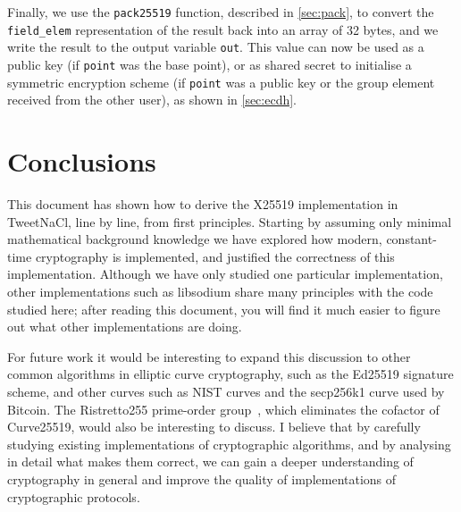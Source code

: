 \documentclass[manuscript]{acmart}
\begin{document}
Finally, we use the \verb|pack25519| function, described in \autoref{sec:pack}, to convert the \verb|field_elem| representation of the result back into an array of 32 bytes, and we write the result to the output variable \verb|out|.
This value can now be used as a public key (if \verb|point| was the base point), or as shared secret to initialise a symmetric encryption scheme (if \verb|point| was a public key or the group element received from the other user), as shown in \autoref{sec:ecdh}.

\section{Conclusions}

This document has shown how to derive the X25519 implementation in TweetNaCl, line by line, from first principles.
Starting by assuming only minimal mathematical background knowledge we have explored how modern, constant-time cryptography is implemented, and justified the correctness of this implementation.
Although we have only studied one particular implementation, other implementations such as libsodium share many principles with the code studied here; after reading this document, you will find it much easier to figure out what other implementations are doing.

For future work it would be interesting to expand this discussion to other common algorithms in elliptic curve cryptography, such as the Ed25519 signature scheme, and other curves such as NIST curves and the secp256k1 curve used by Bitcoin.
The Ristretto255 prime-order group~\cite{Ristretto255}, which eliminates the cofactor of Curve25519, would also be interesting to discuss.
I believe that by carefully studying existing implementations of cryptographic algorithms, and by analysing in detail what makes them correct, we can gain a deeper understanding of cryptography in general and improve the quality of implementations of cryptographic protocols.



\end{document}
